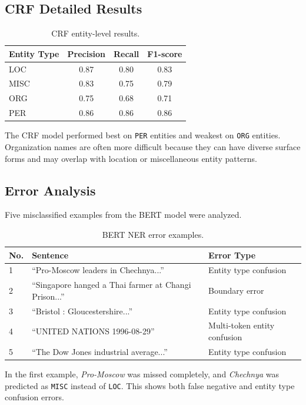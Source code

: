 \documentclass[11pt,a4paper]{article}
\begin{document}
\subsection{CRF Detailed Results}

\begin{table}[H]
\centering
\caption{CRF entity-level results.}
\begin{tabular}{lccc}
\toprule
Entity Type & Precision & Recall & F1-score \\
\midrule
LOC & 0.87 & 0.80 & 0.83 \\
MISC & 0.83 & 0.75 & 0.79 \\
ORG & 0.75 & 0.68 & 0.71 \\
PER & 0.86 & 0.86 & 0.86 \\
\bottomrule
\end{tabular}
\end{table}

The CRF model performed best on \texttt{PER} entities and weakest on \texttt{ORG} entities. Organization names are often more difficult because they can have diverse surface forms and may overlap with location or miscellaneous entity patterns.

\subsection{Error Analysis}

Five misclassified examples from the BERT model were analyzed.

\begin{table}[H]
\centering
\caption{BERT NER error examples.}
\begin{tabular}{p{0.7cm}p{8.5cm}p{5cm}}
\toprule
No. & Sentence & Error Type \\
\midrule
1 & ``Pro-Moscow leaders in Chechnya...'' & Entity type confusion \\
2 & ``Singapore hanged a Thai farmer at Changi Prison...'' & Boundary error \\
3 & ``Bristol : Gloucestershire...'' & Entity type confusion \\
4 & ``UNITED NATIONS 1996-08-29'' & Multi-token entity confusion \\
5 & ``The Dow Jones industrial average...'' & Entity type confusion \\
\bottomrule
\end{tabular}
\end{table}

In the first example, \textit{Pro-Moscow} was missed completely, and \textit{Chechnya} was predicted as \texttt{MISC} instead of \texttt{LOC}. This shows both false negative and entity type confusion errors.
\end{document}
